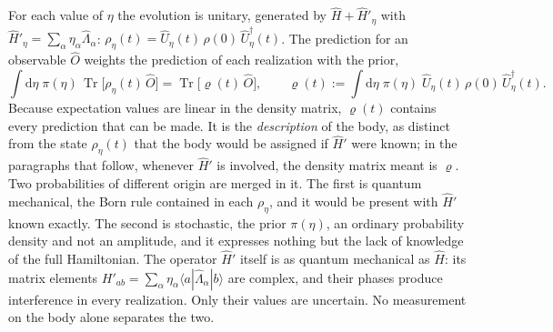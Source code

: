 \documentclass[10pt,a4paper]{article}
\newcommand{\dd}{\mathrm{d}}
\newcommand{\Tr}{\operatorname{Tr}}
\begin{document}
For each value of $ \eta $ the evolution is unitary, generated by $ \hat H + \hat H'_\eta $ with $ \hat H'_\eta = \sum_\alpha\eta_\alpha\hat\Lambda_\alpha $: $ \rho_\eta(t) = \hat U_\eta(t)\,\rho(0)\,\hat U_\eta^\dagger(t) $.
The prediction for an observable $ \hat O $ weights the prediction of each realization with the prior,
\begin{equation}\label{eq:prior_average}
  \int\!\dd\eta\;\pi(\eta)\,\Tr\big[\rho_\eta(t)\,\hat O\big] = \Tr\big[\varrho(t)\,\hat O\big] ,
  \qquad
  \varrho(t) := \int\!\dd\eta\;\pi(\eta)\;\hat U_\eta(t)\,\rho(0)\,\hat U_\eta^\dagger(t) .
\end{equation}
Because expectation values are linear in the density matrix, $ \varrho(t) $ contains every prediction that can be made.
It is the \emph{description} of the body, as distinct from the state $ \rho_\eta(t) $ that the body would be assigned if $ \hat H' $ were known; in the paragraphs that follow, whenever $ \hat H' $ is involved, the density matrix meant is $ \varrho $.
Two probabilities of different origin are merged in it.
The first is quantum mechanical, the Born rule contained in each $ \rho_\eta $, and it would be present with $ \hat H' $ known exactly.
The second is stochastic, the prior $ \pi(\eta) $, an ordinary probability density and not an amplitude, and it expresses nothing but the lack of knowledge of the full Hamiltonian.
The operator $ \hat H' $ itself is as quantum mechanical as $ \hat H $: its matrix elements $ H'_{ab} = \sum_\alpha\eta_\alpha\langle a|\hat\Lambda_\alpha|b\rangle $ are complex, and their phases produce interference in every realization.
Only their values are uncertain.
No measurement on the body alone separates the two.
\end{document}
